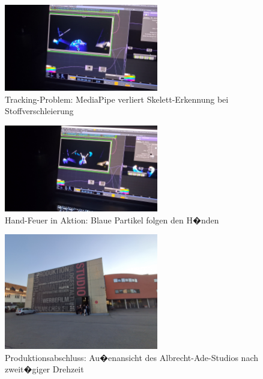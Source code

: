 \begin{figure}[!htbp]
   \centering
   \includegraphics[width=0.6\textwidth,height=0.25\textheight,keepaspectratio]{images/DancerNotMediaPipeFoundCorrectlyWhenInClothOnFloor.png}
   \caption{Tracking-Problem: MediaPipe verliert Skelett-Erkennung bei Stoffverschleierung}
   \label{fig:cloth_tracking_issue}
\end{figure}

\begin{figure}[!htbp]
   \centering
   \includegraphics[width=0.6\textwidth,height=0.25\textheight,keepaspectratio]{images/dancerWithHandFireViewFromKinect.png}
   \caption{Hand-Feuer in Aktion: Blaue Partikel folgen den H�nden}
   \label{fig:hand_fire_action}
\end{figure}

\begin{figure}[!htbp]
   \centering
   \includegraphics[width=0.6\textwidth,height=0.25\textheight,keepaspectratio]{images/onSetImages/WideShotOfOutsideOfStudioAfter2DayShoot.jpg}
   \caption{Produktionsabschluss: Au�enansicht des Albrecht-Ade-Studios nach zweit�giger Drehzeit}
   \label{fig:studio_exterior}
\end{figure}

